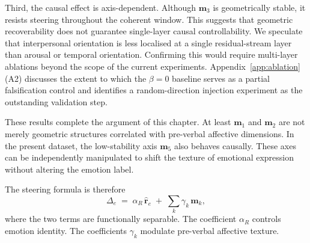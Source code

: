 Third, the causal effect is axis-dependent. Although $\mathbf{m}_3$ is geometrically stable, it resists steering throughout the coherent window. This suggests that geometric recoverability does not guarantee single-layer causal controllability. We speculate that interpersonal orientation is less localised at a single residual-stream layer than arousal or temporal orientation. Confirming this would require multi-layer ablations beyond the scope of the current experiments. Appendix~\ref{app:ablation} (A2) discusses the extent to which the $\beta=0$ baseline serves as a partial falsification control and identifies a random-direction injection experiment as the outstanding validation step.\par

These results complete the argument of this chapter. At least $\mathbf{m}_1$ and $\mathbf{m}_2$ are not merely geometric structures correlated with pre-verbal affective dimensions. In the present dataset, the low-stability axis $\mathbf{m}_5$ also behaves causally. These axes can be independently manipulated to shift the texture of emotional expression without altering the emotion label.\par
The steering formula is therefore
\[ 
\Delta_e \;=\; \alpha_R\,\hat{\mathbf{r}}_e \;+\; \sum_{k}\gamma_k\,\mathbf{m}_k, 
\]
where the two terms are functionally separable. The coefficient $\alpha_R$ controls emotion identity. The coefficients $\gamma_k$ modulate pre-verbal affective texture.\par